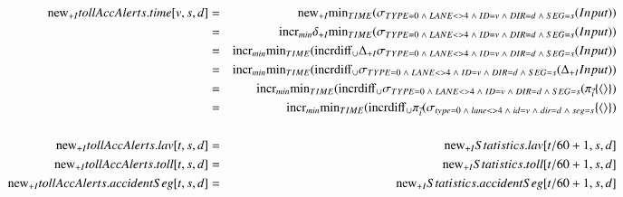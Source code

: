 \begin{eqnarray*}
\mathrm{new}_{+I} tollAccAlerts.time[v,s,d] 
&=& \mathrm{new}_{+I} \mathrm{min}_{TIME} ( \sigma_{TYPE =0 \;\wedge\; LANE <> 4 \;\wedge\; ID = v \;\wedge\; DIR = d \;\wedge\; SEG = s} (Input))\\
&=& \mathrm{incr}_{min} \delta_{+I} \mathrm{min}_{TIME} ( \sigma_{TYPE =0 \;\wedge\; LANE <> 4 \;\wedge\; ID = v \;\wedge\; DIR = d \;\wedge\; SEG = s} (Input))\\
&=& \mathrm{incr}_{min} \mathrm{min}_{TIME} ( \mathrm{incrdiff}_{\cup} \Delta_{+I} \sigma_{TYPE =0 \;\wedge\; LANE <> 4 \;\wedge\; ID = v \;\wedge\; DIR = d \;\wedge\; SEG = s} (Input) )\\
&=& \mathrm{incr}_{min} \mathrm{min}_{TIME} ( \mathrm{incrdiff}_{\cup} \sigma_{TYPE =0 \;\wedge\; LANE <> 4 \;\wedge\; ID = v \;\wedge\; DIR = d \;\wedge\; SEG = s} (\Delta_{+I} Input) )\\
&=& \mathrm{incr}_{min} \mathrm{min}_{TIME} ( \mathrm{incrdiff}_{\cup} \sigma_{TYPE =0 \;\wedge\; LANE <> 4 \;\wedge\; ID = v \;\wedge\; DIR = d \;\wedge\; SEG = s} (\pi_{\vec{i}} \{{\langle\rangle}\})\\
&=& \mathrm{incr}_{min} \mathrm{min}_{TIME} ( \mathrm{incrdiff}_{\cup} \pi_{\vec{i}} (\sigma_{type =0 \;\wedge\; lane <> 4 \;\wedge\; id = v \;\wedge\; dir = d \;\wedge\; seg = s} \{{\langle\rangle}\})\\\\
\mathrm{new}_{+I} tollAccAlerts.lav[t,s,d] &=& \mathrm{new}_{+I} Statistics.lav[t/60+1, s, d]\\
\mathrm{new}_{+I} tollAccAlerts.toll[t,s,d] &=& \mathrm{new}_{+I} Statistics.toll[t/60+1, s, d]\\
\mathrm{new}_{+I} tollAccAlerts.accidentSeg[t,s,d] &=& \mathrm{new}_{+I} Statistics.accidentSeg[t/60+1, s, d]
\end{eqnarray*}
\\\\

